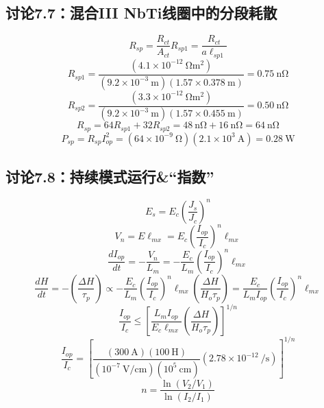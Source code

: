 \subsection{讨论7.7：混合III NbTi线圈中的分段耗散}
\begin{equation}%
R_{sp}=\frac{R_{ct}}{A_{ct}}
R_{sp1}=\frac{R_{ct}}{a\ell_{sp1}}
\end{equation}
\begin{equation}%
R_{sp1}=\frac{(4.1\times 10^{-12}\ \mathrm{\Omega m^2})}{(9.2\times 10^{-3}\ \mathrm{m})(1.57\times 0.378\ \mathrm{m})}=0.75\ \mathrm{n\Omega}
\end{equation}
\begin{equation}%
R_{sp2}=\frac{(3.3\times 10^{-12}\ \mathrm{\Omega m^2})}{(9.2\times 10^{-3}\ \mathrm{m})(1.57\times 0.455\ \mathrm{m})}=0.50\ \mathrm{n\Omega}
\end{equation}
\begin{equation}%
R_{sp}=64R_{sp1}+32R_{sp2}=48\ \mathrm{n\Omega}+16\ \mathrm{n\Omega}=64\ \mathrm{n\Omega}
\end{equation}
\begin{equation}%
P_{sp}=R_{sp}I_{op}^{2}=(64\times 10^{-9}\ \mathrm{\Omega})(2.1\times 10^3\ \mathrm{A})=0.28\ \mathrm{W}
\end{equation}




\subsection{讨论7.8：持续模式运行\&“指数”}
\begin{equation}%
E_s=E_c\left(\frac{J_s}{J_c}\right)^n
\end{equation}
\begin{equation}%
V_n=E\ell_{mx}=E_c\left(\frac{I_{op}}{I_c}\right)^n\ell_{mx}
\end{equation}
\begin{equation}%
\frac{dI_{op}}{dt}=-\frac{V_n}{L_m}=-\frac{E_c}{L_m}\left(\frac{I_{op}}{I_c}\right)^n\ell_{mx}
\end{equation}
\begin{equation}%
\frac{dH}{dt}=-\left(\frac{\Delta H}{\tau_p}\right)\propto-\frac{E_c}{L_m}\left(\frac{I_{op}}{I_c}\right)^n\ell_{mx}
\left(\frac{\Delta H}{H_o\tau_p}\right)=\frac{E_c}{L_m I_{op}}\left(\frac{I_{op}}{I_c}\right)^n\ell_{mx}
\end{equation}
\begin{equation}%
\frac{I_{op}}{I_c}\leq\left[\frac{L_mI_{op}}{E_c\ell_{mx}}\left(\frac{\Delta H}{H_o\tau_p}\right)\right]^{1/n}
\end{equation}
\begin{equation}%
\frac{I_{op}}{I_c}=\left[\frac{(300\ \mathrm{A})(100\ \mathrm{H})}{(10^{-7}\ \mathrm{V/cm})(10^5\ \mathrm{cm})}(2.78\times 10^{-12}\ \mathrm{/s})\right]^{1/n}
\end{equation}
\begin{equation}%
n=\frac{\ln(V_2/V_1)}{\ln(I_2/I_1)}
\end{equation}





